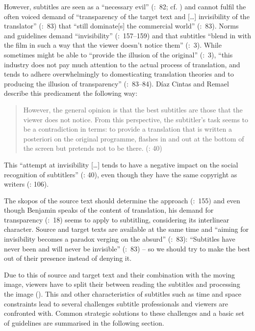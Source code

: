 However, subtitles are seen as a “necessary evil” (\citealt{Foerster2010}:~82; cf. \citealt{marleau1982}) and cannot fulfil the often voiced demand of “transparency of the target text and […] invisibility of the translator” (\citealt{Foerster2010}:~83) that “still dominate[s] the commercial world” (\citealt{Foerster2010}:~83). Norms and guidelines demand “invisibility” (\citealt{Ivarsson1998}:~157--159) and that subtitles “blend in with the film in such a way that the viewer doesn’t notice them” (\citealt{subtitling_international_uk1994}:~3). While  sometimes might be able to “provide the illusion of the original” (\citealt{subtitling_international_uk1994}:~3), “this industry does not pay much attention to the actual process of translation, and tends to adhere overwhelmingly to domesticating translation theories and to producing the illusion of transparency” (\citealt{subtitling_international_uk1994}:~83--84). Díaz Cintas and Remael describe this predicament the following way:
\begin{quote}
However, the general opinion is that the best subtitles are those that the viewer does not notice. From this perspective, the subtitler’s task seems to be a contradiction in terms: to provide a translation that is written a posteriori on the original programme, flashes in and out at the bottom of the screen but pretends not to be there. (\citeyear{Diaz_cintas2007}: 40)
\end{quote}

This “attempt at invisibility […] tends to have a negative impact on the social recognition of subtitlers” (\citealt{Diaz_cintas2007}: 40), even though they have the same copyright as writers (\citealt{Ivarsson1992}: 106). 

The skopos of the source text should determine the approach (\citealt{stolze1997}:~155) and even though Benjamin speaks of the content of translation, his demand for transparency (\citeyear{Benjamin1972}:~18) seems to apply to subtitling, considering its interlinear character. Source and target texts are available at the same time and “aiming for invisibility becomes a paradox verging on the absurd” (\citealt{Foerster2010}:~83): “Subtitles have never been and will never be invisible” (\citealt{Foerster2010}:~83) – so we should try to make the best out of their presence instead of denying it.

Due to this  of source and target text and their combination with the moving image, viewers have to split their  between reading the subtitles and processing the image (\citealt{Bayram2012}). This and other characteristics of subtitles such as time and space constraints lead to several challenges subtitle professionals and viewers are confronted with. Common strategic solutions to these challenges and a basic set of guidelines are summarised in the following section.

